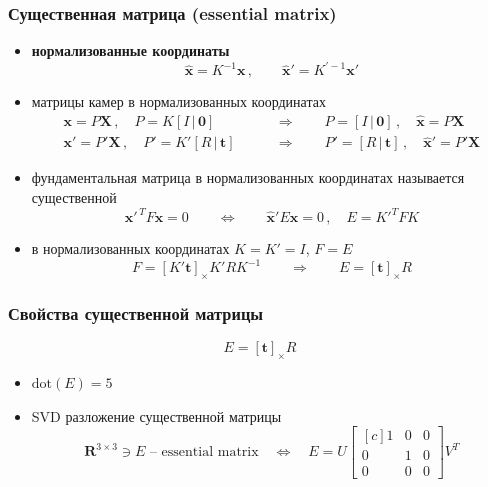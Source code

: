 \documentclass[12pt,notheorems,usepdftitle=false,aspectratio=1610]{beamer}
\theoremstyle{definition} %
\begin{document}
\begin{frame}
    \frametitle{Существенная матрица (essential matrix)}
    \begin{itemize}
        \item \textbf{нормализованные координаты}
        $$
            \widehat{\mathbf{x}}=K^{-1}\mathbf{x}\,,\qquad
            \widehat{\mathbf{x}}'=K^{'-1}\mathbf{x}'
        $$
        \item матрицы камер в нормализованных координатах
        \begin{align*}
            \mathbf{x}=P\mathbf{X}\,,\quad
            P=K[I\,|\,\mathbf{0}]
            \qquad&\Rightarrow\qquad
            P=[I\,|\,\mathbf{0}]\,,\quad
            \widehat{\mathbf{x}}=P\mathbf{X}\\
            \mathbf{x}'=P'\mathbf{X}\,,\quad
            P'=K'[R\,|\,\mathbf{t}]
            \qquad&\Rightarrow\qquad
            P'=[R\,|\,\mathbf{t}]\,,\quad
            \widehat{\mathbf{x}}'=P'\mathbf{X}
        \end{align*}
        \item фундаментальная матрица в нормализованных координатах называется существенной
        $$
            \mathbf{x}'^{\,T}F\mathbf{x}=0
            \qquad\Leftrightarrow\qquad
            \widehat{\mathbf{x}}'E\widehat{\mathbf{x}}=0\,,\quad
            E=K'^TFK
        $$
        \item в нормализованных координатах $K=K'=I$, $F=E$
        $$
            F=\left[K'\mathbf{t}\right]_\times K'RK^{-1}
            \qquad\Rightarrow\qquad
            E=\left[\mathbf{t}\right]_\times R
        $$
    \end{itemize}
\end{frame}

\begin{frame}
\frametitle{Свойства существенной матрицы}
$$
    E=\left[\mathbf{t}\right]_\times R
$$
\begin{itemize}
    \item $\mathrm{dot}(E)=5$
    \item SVD разложение существенной матрицы
    $$
        \mathbf{R}^{3\times3}\ni E
        \,\,\mbox{-- essential matrix}
        \quad\Leftrightarrow\quad
        E=U
        \begin{bmatrix*}[c]
            1 & 0 & 0\\
            0 & 1 & 0\\
            0 & 0 & 0
        \end{bmatrix*}
        V^T
    $$
\end{itemize}
\end{frame}
\end{document}
